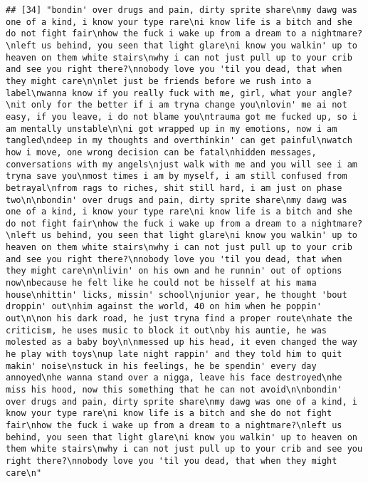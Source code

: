 \documentclass[]{article}
\begin{document}
\begin{verbatim}
## [34] "bondin' over drugs and pain, dirty sprite share\nmy dawg was one of a kind, i know your type rare\ni know life is a bitch and she do not fight fair\nhow the fuck i wake up from a dream to a nightmare?\nleft us behind, you seen that light glare\ni know you walkin' up to heaven on them white stairs\nwhy i can not just pull up to your crib and see you right there?\nnobody love you 'til you dead, that when they might care\n\nlet just be friends before we rush into a label\nwanna know if you really fuck with me, girl, what your angle?\nit only for the better if i am tryna change you\nlovin' me ai not easy, if you leave, i do not blame you\ntrauma got me fucked up, so i am mentally unstable\n\ni got wrapped up in my emotions, now i am tangled\ndeep in my thoughts and overthinkin' can get painful\nwatch how i move, one wrong decision can be fatal\nhidden messages, conversations with my angels\njust walk with me and you will see i am tryna save you\nmost times i am by myself, i am still confused from betrayal\nfrom rags to riches, shit still hard, i am just on phase two\n\nbondin' over drugs and pain, dirty sprite share\nmy dawg was one of a kind, i know your type rare\ni know life is a bitch and she do not fight fair\nhow the fuck i wake up from a dream to a nightmare?\nleft us behind, you seen that light glare\ni know you walkin' up to heaven on them white stairs\nwhy i can not just pull up to your crib and see you right there?\nnobody love you 'til you dead, that when they might care\n\nlivin' on his own and he runnin' out of options now\nbecause he felt like he could not be hisself at his mama house\nhittin' licks, missin' school\njunior year, he thought 'bout droppin' out\nhim against the world, 40 on him when he poppin' out\n\non his dark road, he just tryna find a proper route\nhate the criticism, he uses music to block it out\nby his auntie, he was molested as a baby boy\n\nmessed up his head, it even changed the way he play with toys\nup late night rappin' and they told him to quit makin' noise\nstuck in his feelings, he be spendin' every day annoyed\nhe wanna stand over a nigga, leave his face destroyed\nhe miss his hood, now this something that he can not avoid\n\nbondin' over drugs and pain, dirty sprite share\nmy dawg was one of a kind, i know your type rare\ni know life is a bitch and she do not fight fair\nhow the fuck i wake up from a dream to a nightmare?\nleft us behind, you seen that light glare\ni know you walkin' up to heaven on them white stairs\nwhy i can not just pull up to your crib and see you right there?\nnobody love you 'til you dead, that when they might care\n"                                                                                                                                                                                                                                                                                                                                                                                                                                                                                                                                                                                                                                                                                                        
\end{verbatim}
\end{document}
